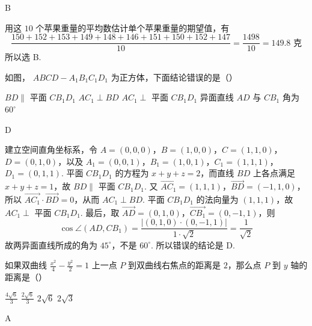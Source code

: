 \begin{answer}
B
\end{answer}

\begin{solution}
用这 \(10\) 个苹果重量的平均数估计单个苹果重量的期望值，有
\[
\frac{150+152+153+149+148+146+151+150+152+147}{10}
 =\frac{1498}{10}=149.8\text{ 克}
\]
所以选 B.
\end{solution}

\begin{problem}
如图， \(ABCD - A_{1}B_{1}C_{1}D_{1}\) 为正方体，下面结论错误的是（\quad）

\FloatBarrier

\choices
    {\(BD \parallel\) 平面 \(CB_{1}D_{1}\)}
    {\(AC_{1} \perp BD\)}
    {\(AC_{1} \perp\) 平面 \(CB_{1}D_{1}\)}
    {异面直线 \(AD\) 与 \(CB_{1}\) 角为 \(60^{\circ}\)}
\end{problem}

\begin{answer}
D
\end{answer}

\begin{solution}
建立空间直角坐标系，令 \(A=(0,0,0)\)，\(B=(1,0,0)\)，\(C=(1,1,0)\)，\(D=(0,1,0)\)，以及
\(A_{1}=(0,0,1)\)，\(B_{1}=(1,0,1)\)，\(C_{1}=(1,1,1)\)，\(D_{1}=(0,1,1)\).
平面 \(CB_{1}D_{1}\) 的方程为 \(x+y+z=2\)，而直线 \(BD\) 上各点满足 \(x+y+z=1\)，故 \(BD\parallel\) 平面 \(CB_{1}D_{1}\). 又 \(\overrightarrow{AC_{1}}=(1,1,1)\)，\(\overrightarrow{BD}=(-1,1,0)\)，
所以 \(\overrightarrow{AC_{1}}\cdot\overrightarrow{BD}=0\)，从而 \(AC_{1}\perp BD\). 平面 \(CB_{1}D_{1}\) 的法向量为 \((1,1,1)\)，故 \(AC_{1}\perp\) 平面 \(CB_{1}D_{1}\). 最后，取 \(\overrightarrow{AD}=(0,1,0)\)，\(\overrightarrow{CB_{1}}=(0,-1,1)\)，则
\[
\cos\angle(AD,CB_{1})=\frac{|(0,1,0)\cdot(0,-1,1)|}{1\cdot\sqrt2}=\frac{1}{\sqrt2}
\]
故两异面直线所成的角为 \(45^{\circ}\)，不是 \(60^{\circ}\). 所以错误的结论是 D.
\end{solution}

\begin{problem}
如果双曲线 \(\frac{x^2}{4} - \frac{y^2}{2} = 1\) 上一点 \(P\) 到双曲线右焦点的距离是 \(2\)，那么点 \(P\) 到 \(y\) 轴的距离是（\quad）

\choices
    {\(\frac{4\sqrt{6}}{3}\)}
    {\(\frac{2\sqrt{6}}{3}\)}
    {\(2\sqrt{6}\)}
    {\(2\sqrt{3}\)}
\end{problem}

\begin{answer}
A
\end{answer}

